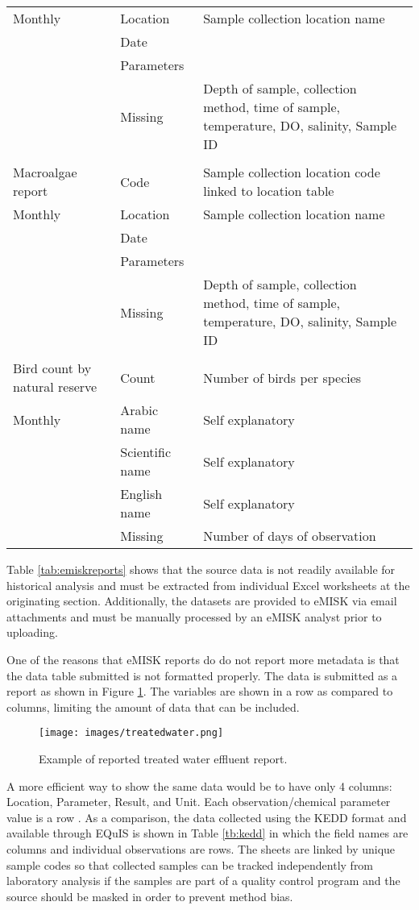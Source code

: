 \begin{table}[H]
{\begin{tabular}{@{}lll@{}}
Monthly & Location & Sample collection location name \\
 & Date &  \\
 & Parameters &  \\
 & Missing & Depth of sample, collection method, time of sample, temperature, DO, salinity, Sample ID \\
 &  &  \\
Macroalgae report & Code & Sample collection location code linked to location table \\
Monthly & Location & Sample collection location name \\
 & Date &  \\
 & Parameters &  \\
 & Missing & Depth of sample, collection method, time of sample, temperature, DO, salinity, Sample ID \\
 &  &  \\
Bird count by natural reserve & Count & Number of birds per species \\
Monthly & Arabic name & Self explanatory \\
 & Scientific name & Self explanatory \\
 & English name & Self explanatory \\
 & Missing & Number of days of observation \\ \bottomrule
\end{tabular}
}%
\end{table}

Table \ref{tab:emiskreports} shows that the source data is not readily available for historical analysis and must be extracted from individual Excel worksheets at the originating section. Additionally, the datasets are provided to eMISK via email attachments and must be manually processed by an eMISK analyst prior to uploading. 

One of the reasons that eMISK reports do do not report more metadata is that the data table submitted is not formatted properly. The data is submitted as a report as shown in Figure \ref{fig:treatedwater}. The variables are shown in a row as compared to columns, limiting the amount of data that can be included.

\begin{figure}[H]
\centering
\texttt{[image: images/treatedwater.png]} 
\caption{Example of reported treated water effluent report.}
\label{fig:treatedwater}
\end{figure}
%
A more efficient way to show the same data would be to have only 4 columns: Location, Parameter, Result, and Unit. Each observation/chemical parameter value is a row \citep{Wickham2014}. As a comparison, the data collected using the KEDD format and available through EQuIS is shown in Table \ref{tb:kedd} in which the field names are columns and individual observations are rows. The sheets are linked by unique sample codes so that collected samples can be tracked independently from laboratory analysis if the samples are part of a quality control program and the source should be masked in order to prevent method bias.

